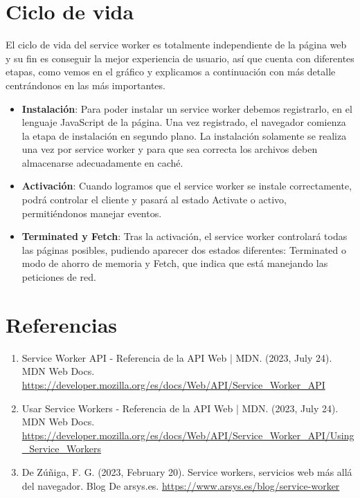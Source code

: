 \documentclass{article}
\begin{document}
\section{Ciclo de vida}
El ciclo de vida del service worker es totalmente independiente de la página web y su fin es conseguir la mejor experiencia de usuario, así que cuenta con diferentes etapas, como vemos en el gráfico y explicamos a continuación con más detalle centrándonos en las más importantes.
\begin{itemize}
    \item \textbf{Instalación}: Para poder instalar un service worker debemos registrarlo, en el lenguaje JavaScript de la página. Una vez registrado, el navegador comienza la etapa de instalación en segundo plano. La instalación solamente se realiza una vez por service worker y para que sea correcta los archivos deben almacenarse adecuadamente en caché.
    \item \textbf{Activación}: Cuando logramos que el service worker se instale correctamente, podrá controlar el cliente y pasará al estado Activate o activo, permitiéndonos manejar eventos.
    \item \textbf{Terminated y Fetch}: Tras la activación, el service worker controlará todas las páginas posibles, pudiendo aparecer dos estados diferentes: Terminated o modo de ahorro de memoria y Fetch, que indica que está manejando las peticiones de red.
\end{itemize}

\section{Referencias}
\begin{enumerate}
    \item Service Worker API - Referencia de la API Web | MDN. (2023, July 24). MDN Web Docs. \url{https://developer.mozilla.org/es/docs/Web/API/Service_Worker_API}
    \item Usar Service Workers - Referencia de la API Web | MDN. (2023, July 24). MDN Web Docs. \url{https://developer.mozilla.org/es/docs/Web/API/Service_Worker_API/Using_Service_Workers}
    \item De Zúñiga, F. G. (2023, February 20). Service workers, servicios web más allá del navegador. Blog De arsys.es. \url{https://www.arsys.es/blog/service-worker}
\end{enumerate}
\end{document}
